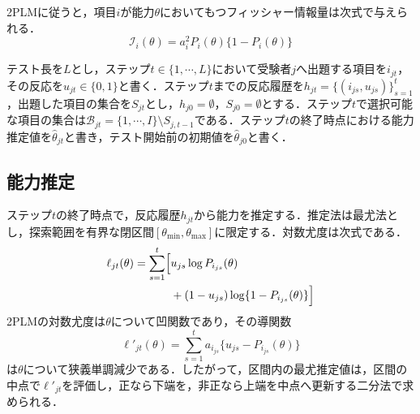 \documentclass[paper]{ieicej}
\begin{document}
2PLMに従うと，項目$i$が能力$\theta$においてもつフィッシャー情報量は次式で与えられる．
\begin{equation}
 \mathcal{I}_i(\theta)=a_i^2P_i(\theta)\{1-P_i(\theta)\}
 \label{eq:info}
\end{equation}

テスト長を$L$とし，ステップ$t\in\{1,\cdots,L\}$において受験者$j$へ出題する項目を$i_{jt}$，その反応を$u_{jt}\in\{0,1\}$と書く．ステップ$t$までの反応履歴を$h_{jt}=\{(i_{js},u_{js})\}_{s=1}^{t}$，出題した項目の集合を$S_{jt}$とし，$h_{j0}=\emptyset$，$S_{j0}=\emptyset$とする．ステップ$t$で選択可能な項目の集合は$\mathcal{B}_{jt}=\{1,\cdots,I\}\setminus S_{j,t-1}$である．ステップ$t$の終了時点における能力推定値を$\hat\theta_{jt}$と書き，テスト開始前の初期値を$\hat\theta_{j0}$と書く．

\subsection{能力推定}\label{sec:est}

ステップ$t$の終了時点で，反応履歴$h_{jt}$から能力を推定する．推定法は最尤法とし，探索範囲を有界な閉区間$[\theta_{\min},\theta_{\max}]$に限定する．対数尤度は次式である．
\begin{equation}
 \begin{aligned}
 \ell_{jt}(\theta)=\sum_{s=1}^{t}\Bigl[&u_{js}\log P_{i_{js}}(\theta)\\
 &+(1-u_{js})\log\{1-P_{i_{js}}(\theta)\}\Bigr]
 \end{aligned}
 \label{eq:loglik}
\end{equation}
2PLMの対数尤度は$\theta$について凹関数であり，その導関数
\begin{equation}
 \ell'_{jt}(\theta)=\sum_{s=1}^{t}a_{i_{js}}\{u_{js}-P_{i_{js}}(\theta)\}
 \label{eq:score}
\end{equation}
は$\theta$について狭義単調減少である．したがって，区間内の最尤推定値は，区間の中点で$\ell'_{jt}$を評価し，正なら下端を，非正なら上端を中点へ更新する二分法で求められる．
\end{document}
